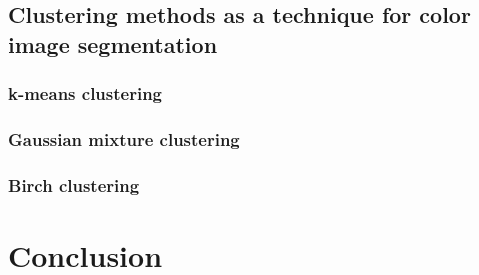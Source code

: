 \subsection{Clustering methods as a technique for color image segmentation}


\subsubsection{k-means clustering}
\subsubsection{Gaussian mixture clustering}
\subsubsection{Birch clustering}





\section{Conclusion}
